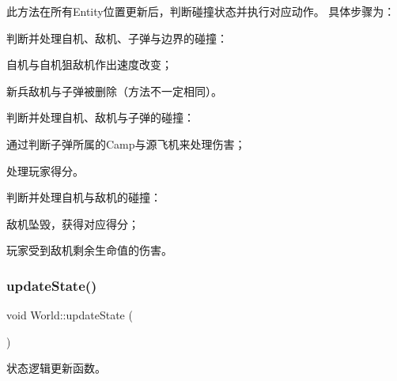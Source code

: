 此方法在所有\+Entity位置更新后，判断碰撞状态并执行对应动作。 具体步骤为：
\begin{DoxyEnumerate}
\item 判断并处理{\ttfamily 自机、敌机、子弹}与{\ttfamily 边界}的碰撞：
\begin{DoxyItemize}
\item 自机与自机狙敌机作出速度改变；
\item 新兵敌机与子弹被删除（方法不一定相同）。
\end{DoxyItemize}
\item 判断并处理{\ttfamily 自机、敌机}与{\ttfamily 子弹}的碰撞：
\begin{DoxyItemize}
\item 通过判断子弹所属的\+Camp与源飞机来处理伤害；
\item 处理玩家得分。
\end{DoxyItemize}
\item 判断并处理{\ttfamily 自机}与{\ttfamily 敌机}的碰撞：
\begin{DoxyItemize}
\item 敌机坠毁，获得对应得分；
\item 玩家受到敌机剩余生命值的伤害。 
\end{DoxyItemize}
\end{DoxyEnumerate}\mbox{\label{class_world_a6a1abe665fc8056caf3dd84663bccfb8}} 
\subsubsection{\texorpdfstring{update\+State()}{updateState()}}
{\footnotesize\ttfamily void World\+::update\+State (\begin{DoxyParamCaption}{ }\end{DoxyParamCaption})}



状态逻辑更新函数。 

